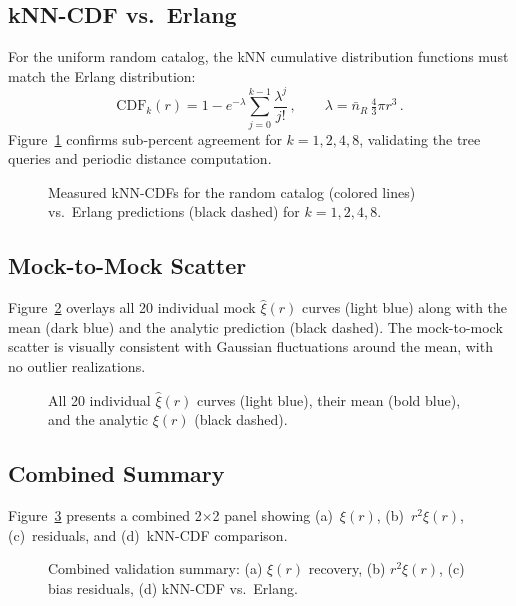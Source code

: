 \documentclass[11pt]{article}
\begin{document}
\subsection{kNN-CDF vs.\ Erlang}

For the uniform random catalog, the kNN cumulative distribution
functions must match the Erlang distribution:
\begin{equation}
  \mathrm{CDF}_k(r)
    = 1 - e^{-\lambda}\sum_{j=0}^{k-1}\frac{\lambda^j}{j!}\,,
  \qquad \lambda = \bar{n}_R\,\tfrac{4}{3}\pi r^3\,.
\end{equation}
Figure~\ref{fig:cdf_erlang} confirms sub-percent agreement for
$k = 1, 2, 4, 8$, validating the tree queries and periodic distance
computation.

\begin{figure}[ht]
  \centering
  
  \caption{Measured kNN-CDFs for the random catalog (colored lines) vs.\
  Erlang predictions (black dashed) for $k = 1, 2, 4, 8$.}
  \label{fig:cdf_erlang}
\end{figure}

\subsection{Mock-to-Mock Scatter}

Figure~\ref{fig:individual} overlays all 20 individual mock
$\hat\xi(r)$ curves (light blue) along with the mean (dark blue) and
the analytic prediction (black dashed).  The mock-to-mock scatter is
visually consistent with Gaussian fluctuations around the mean, with no
outlier realizations.

\begin{figure}[ht]
  \centering
  
  \caption{All 20 individual $\hat\xi(r)$ curves (light blue), their
  mean (bold blue), and the analytic $\xi(r)$ (black dashed).}
  \label{fig:individual}
\end{figure}

\subsection{Combined Summary}

Figure~\ref{fig:summary} presents a combined 2$\times$2 panel showing
(a)~$\xi(r)$, (b)~$r^2\xi(r)$, (c)~residuals, and (d)~kNN-CDF
comparison.

\begin{figure}[ht]
  \centering
  
  \caption{Combined validation summary: (a) $\xi(r)$ recovery,
  (b) $r^2\xi(r)$, (c) bias residuals, (d) kNN-CDF vs.\ Erlang.}
  \label{fig:summary}
\end{figure}
\end{document}
